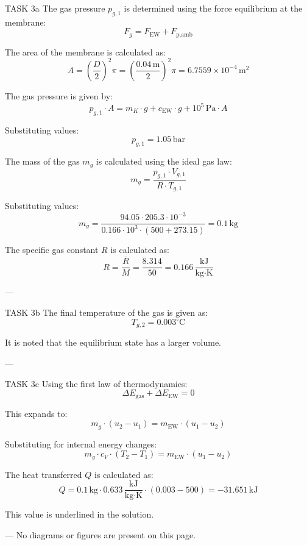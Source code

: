 TASK 3a  
The gas pressure \( p_{g,1} \) is determined using the force equilibrium at the membrane:  
\[
F_g = F_{\text{EW}} + F_{\text{p,amb}}
\]  

The area of the membrane is calculated as:  
\[
A = \left(\frac{D}{2}\right)^2 \pi = \left(\frac{0.04 \, \text{m}}{2}\right)^2 \pi = 6.7559 \times 10^{-4} \, \text{m}^2
\]  

The gas pressure is given by:  
\[
p_{g,1} \cdot A = m_K \cdot g + c_{\text{EW}} \cdot g + 10^5 \, \text{Pa} \cdot A
\]  

Substituting values:  
\[
p_{g,1} = 1.05 \, \text{bar}
\]  

The mass of the gas \( m_g \) is calculated using the ideal gas law:  
\[
m_g = \frac{p_{g,1} \cdot V_{g,1}}{R \cdot T_{g,1}}
\]  

Substituting values:  
\[
m_g = \frac{94.05 \cdot 205.3 \cdot 10^{-3}}{0.166 \cdot 10^3 \cdot (500 + 273.15)} = 0.1 \, \text{kg}
\]  

The specific gas constant \( R \) is calculated as:  
\[
R = \frac{\bar{R}}{M} = \frac{8.314}{50} = 0.166 \, \frac{\text{kJ}}{\text{kg·K}}
\]  

---

TASK 3b  
The final temperature of the gas is given as:  
\[
T_{g,2} = 0.003^\circ\text{C}
\]  

It is noted that the equilibrium state has a larger volume.  

---

TASK 3c  
Using the first law of thermodynamics:  
\[
\Delta E_{\text{gas}} + \Delta E_{\text{EW}} = 0
\]  

This expands to:  
\[
m_g \cdot (u_2 - u_1) = m_{\text{EW}} \cdot (u_1 - u_2)
\]  

Substituting for internal energy changes:  
\[
m_g \cdot c_V \cdot (T_2 - T_1) = m_{\text{EW}} \cdot (u_1 - u_2)
\]  

The heat transferred \( Q \) is calculated as:  
\[
Q = 0.1 \, \text{kg} \cdot 0.633 \, \frac{\text{kJ}}{\text{kg·K}} \cdot (0.003 - 500) = -31.651 \, \text{kJ}
\]  

This value is underlined in the solution.  

---  
No diagrams or figures are present on this page.